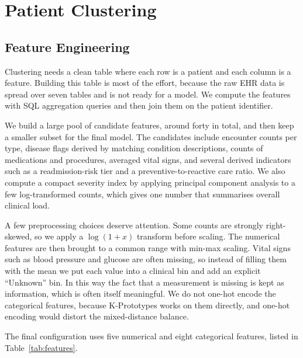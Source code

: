 
\section{Patient Clustering}
\label{sec:clustering}

\subsection{Feature Engineering}

Clustering needs a clean table where each row is a patient and each column is a feature. Building this table is most of the effort, because the raw EHR data is spread over seven tables and is not ready for a model. We compute the features with SQL aggregation queries and then join them on the patient identifier.

We build a large pool of candidate features, around forty in total, and then keep a smaller subset for the final model. The candidates include encounter counts per type, disease flags derived by matching condition descriptions, counts of medications and procedures, averaged vital signs, and several derived indicators such as a readmission-risk tier and a preventive-to-reactive care ratio. We also compute a compact severity index by applying principal component analysis to a few log-transformed counts, which gives one number that summarises overall clinical load.

A few preprocessing choices deserve attention. Some counts are strongly right-skewed, so we apply a $\log(1+x)$ transform before scaling. The numerical features are then brought to a common range with min-max scaling. Vital signs such as blood pressure and glucose are often missing, so instead of filling them with the mean we put each value into a clinical bin and add an explicit ``Unknown'' bin. In this way the fact that a measurement is missing is kept as information, which is often itself meaningful. We do not one-hot encode the categorical features, because K-Prototypes works on them directly, and one-hot encoding would distort the mixed-distance balance.

The final configuration uses five numerical and eight categorical features, listed in Table~\ref{tab:features}.


